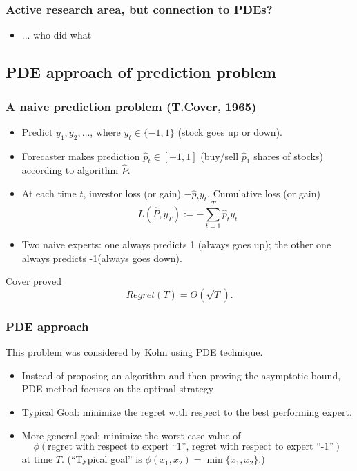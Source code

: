 \documentclass{beamer}
\begin{document}
\begin{frame}
\frametitle{Active research area, but connection to PDEs?}
\begin{itemize}
\item ... who did what
\end{itemize}


\end{frame}



\subsection{PDE approach of prediction problem}

\begin{frame}
\frametitle{A naive prediction problem (T.Cover, 1965)}
\begin{itemize}
\item Predict $y_1,y_2,\ldots$, where $y_t\in\{-1,1\}$ ({\color{blue}stock goes up or down}). 
\item Forecaster makes prediction $\hat{p}_t\in[-1,1]$ ({\color{blue}buy/sell $\hat{p}_1$ shares of stocks}) according to algorithm $\hat{P}$. 
\item At each time $t$, investor loss (or gain) $-\hat{p}_ty_t$. Cumulative loss (or gain)
$$L(\hat{P},y_T) := -\sum_{t=1}^T\hat{p}_ty_t$$
\item Two naive experts: one always predicts 1 ({\color{blue}always goes up}); the other one always predicts -1({\color{blue}always goes down}).
\end{itemize}
Cover proved $$Regret(T) = \Theta(\sqrt{T}).$$

\end{frame}

\begin{frame}
\frametitle{PDE approach}
This problem was considered by Kohn using PDE technique.  
\begin{itemize}
\item Instead of proposing an algorithm and then proving the asymptotic bound, PDE method focuses on the optimal strategy
\item Typical Goal: minimize the regret with respect to the best performing expert.
\item More general goal: minimize the worst case value of 
$$\phi(\text{regret with respect to expert ``1'', regret with respect to expert ``-1''})$$
at time $T$. (``Typical goal'' is $\phi(x_1,x_2) = \min\{x_1,x_2\}$.)
\end{itemize}


\end{frame}
\end{document}
